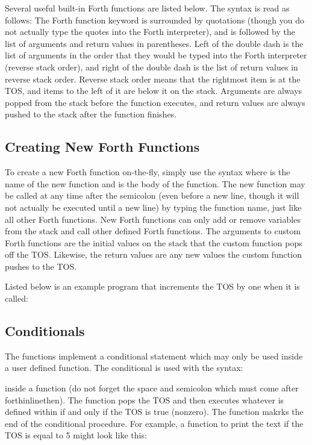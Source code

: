 \documentclass[11pt,pdftex,portrait,letterpaper]{article}
\begin{document}
Several useful built-in Forth functions are listed below. The syntax is read as follows: The Forth function keyword is surrounded by quotations (though you do not actually type the quotes into the Forth interpreter), and is followed by the list of arguments and return values in parentheses. Left of the double dash is the list of arguments in the order that they would be typed into the Forth interpreter (reverse stack order), and right of the double dash is the list of return values in reverse stack order. Reverse stack order means that the rightmost item is at the TOS, and items to the left of it are below it on the stack. Arguments are always popped from the stack before the function executes, and return values are always pushed to the stack after the function finishes.




\subsection{Creating New Forth Functions}
To create a new Forth function on-the-fly, simply use the syntax  where  is the name of the new function and  is the body of the function. The new function may be called at any time after the semicolon (even before a new line, though it will not actually be executed until a new line) by typing the function name, just like all other Forth functions. New Forth functions can only add or remove variables from the stack and call other defined Forth functions. The arguments to custom Forth functions are the initial values on the stack that the custom function pops off the TOS. Likewise, the return values are any new values the custom function pushes to the TOS.

Listed below is an example program that increments the TOS by one when it is called:

\noindent{}


\subsection{Conditionals}
The  functions implement a conditional statement which may only be used inside a user defined function. The conditional is used with the syntax:

\noindent{}

\noindent inside a function (do not forget the space and semicolon which must come after forthinline{then}). The  function pops the TOS and then executes whatever is defined within  if and only if the TOS is true (nonzero). The  function makrks the end of the conditional procedure. For example, a function to print the text  if the TOS is equal to 5 might look like this:
\end{document}
